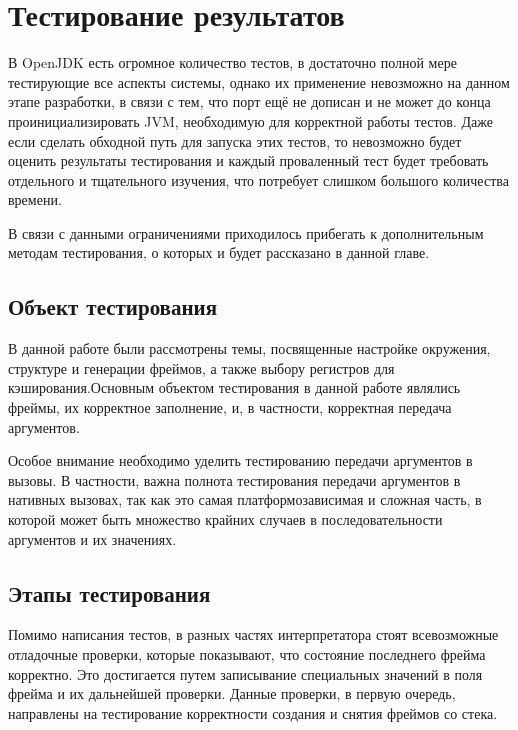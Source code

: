 \section{Тестирование результатов}

В OpenJDK есть огромное количество тестов, в достаточно полной мере тестирующие все аспекты системы, однако их применение невозможно на данном этапе разработки, в связи с тем, что порт ещё не дописан и не может до конца проинициализировать JVM, необходимую для корректной работы тестов.
Даже если сделать обходной путь для запуска этих тестов, то невозможно будет оценить результаты тестирования и каждый проваленный тест будет требовать отдельного и тщательного изучения, что потребует слишком большого количества времени.

В связи с данными ограничениями приходилось прибегать к дополнительным методам тестирования, о которых и будет рассказано в данной главе.



\subsection{Объект тестирования}

В данной работе были рассмотрены темы, посвященные настройке окружения, структуре и генерации фреймов, а также выбору регистров для кэширования.Основным объектом тестирования в данной работе являлись фреймы, их корректное заполнение, и, в частности, корректная передача аргументов.

Особое внимание необходимо уделить тестированию передачи аргументов в вызовы. В частности, важна полнота тестирования передачи аргументов в нативных вызовах, так как это самая платформозависимая и сложная часть, в которой может быть множество крайних случаев в последовательности аргументов и их значениях.


\subsection{Этапы тестирования}

Помимо написания тестов, в разных частях интерпретатора стоят всевозможные отладочные проверки, которые показывают, что состояние последнего фрейма корректно. Это достигается путем записывание специальных значений в поля фрейма и их дальнейшей проверки. Данные проверки, в первую очередь, направлены на тестирование корректности создания и снятия фреймов со стека.

